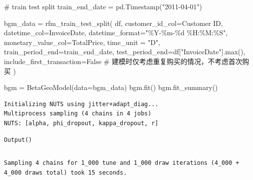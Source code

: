 \documentclass[
]{ctexart}
\newenvironment{Shaded}{\begin{snugshade}}{\end{snugshade}}
\newcommand{\BuiltInTok}[1]{\textcolor[rgb]{0.00,0.23,0.31}{#1}}
\newcommand{\CommentTok}[1]{\textcolor[rgb]{0.37,0.37,0.37}{#1}}
\newcommand{\NormalTok}[1]{\textcolor[rgb]{0.00,0.23,0.31}{#1}}
\newcommand{\OperatorTok}[1]{\textcolor[rgb]{0.37,0.37,0.37}{#1}}
\newcommand{\SpecialCharTok}[1]{\textcolor[rgb]{0.37,0.37,0.37}{#1}}
\newcommand{\StringTok}[1]{\textcolor[rgb]{0.13,0.47,0.30}{#1}}
\newcommand{\VariableTok}[1]{\textcolor[rgb]{0.07,0.07,0.07}{#1}}
\begin{document}
\begin{Shaded}
\begin{Highlighting}[]
\CommentTok{\# train test split }
\NormalTok{train\_end\_date }\OperatorTok{=}\NormalTok{ pd.Timestamp(}\StringTok{"2011{-}04{-}01"}\NormalTok{)}

\NormalTok{bgm\_data }\OperatorTok{=}\NormalTok{ rfm\_train\_test\_split(}
\NormalTok{    df,}
\NormalTok{    customer\_id\_col}\OperatorTok{=}\StringTok{\textquotesingle{}Customer ID\textquotesingle{}}\NormalTok{,}
\NormalTok{    datetime\_col}\OperatorTok{=}\StringTok{\textquotesingle{}InvoiceDate\textquotesingle{}}\NormalTok{,}
\NormalTok{    datetime\_format}\OperatorTok{=}\StringTok{"\%Y{-}\%m{-}}\SpecialCharTok{\%d}\StringTok{ \%H:\%M:\%S"}\NormalTok{,}
\NormalTok{    monetary\_value\_col}\OperatorTok{=}\StringTok{\textquotesingle{}TotalPrice\textquotesingle{}}\NormalTok{,}
\NormalTok{    time\_unit }\OperatorTok{=} \StringTok{"D"}\NormalTok{,}
\NormalTok{    train\_period\_end}\OperatorTok{=}\NormalTok{train\_end\_date,}
\NormalTok{    test\_period\_end}\OperatorTok{=}\NormalTok{df[}\StringTok{"InvoiceDate"}\NormalTok{].}\BuiltInTok{max}\NormalTok{(),}
\NormalTok{    include\_first\_transaction}\OperatorTok{=}\VariableTok{False} \CommentTok{\# 建模时仅考虑重复购买的情况，不考虑首次购买}
\NormalTok{)}

\NormalTok{bgm }\OperatorTok{=}\NormalTok{ BetaGeoModel(data}\OperatorTok{=}\NormalTok{bgm\_data)  }
\NormalTok{bgm.fit()  }
\NormalTok{bgm.fit\_summary()  }
\end{Highlighting}
\end{Shaded}

\begin{verbatim}
Initializing NUTS using jitter+adapt_diag...
Multiprocess sampling (4 chains in 4 jobs)
NUTS: [alpha, phi_dropout, kappa_dropout, r]
\end{verbatim}

\begin{verbatim}
Output()
\end{verbatim}

\begin{verbatim}
\end{verbatim}

\begin{verbatim}
Sampling 4 chains for 1_000 tune and 1_000 draw iterations (4_000 + 4_000 draws total) took 15 seconds.
\end{verbatim}
\end{document}
